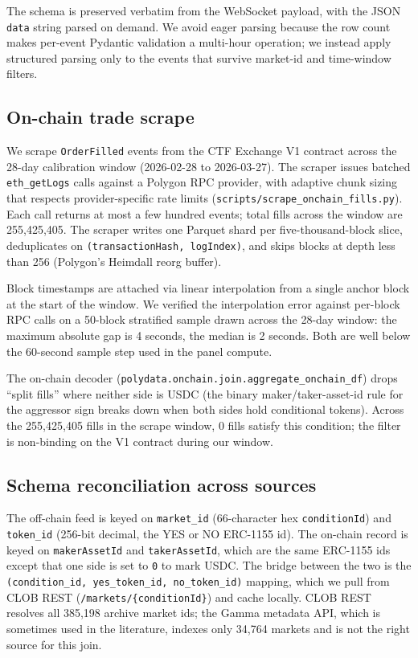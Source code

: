 \documentclass[11pt,a4paper,twocolumn]{article}
\begin{document}
The schema is preserved verbatim from the WebSocket payload, with
the JSON \texttt{data} string parsed on demand. We avoid eager
parsing because the row count makes per-event Pydantic validation a
multi-hour operation; we instead apply structured parsing only to
the events that survive market-id and time-window filters.

\subsection{On-chain trade scrape}

We scrape \texttt{OrderFilled} events from the CTF Exchange V1
contract across the 28-day calibration window (2026-02-28 to
2026-03-27). The scraper issues batched \texttt{eth\_getLogs} calls
against a Polygon RPC provider, with adaptive chunk sizing that
respects provider-specific rate limits
(\texttt{scripts/scrape\_onchain\_fills.py}). Each call returns at
most a few hundred events; total fills across the window are
255{,}425{,}405. The scraper writes one Parquet shard per
five-thousand-block slice, deduplicates on
\texttt{(transactionHash, logIndex)}, and skips blocks at
depth less than 256 (Polygon's Heimdall reorg buffer).

Block timestamps are attached via linear interpolation from a single
anchor block at the start of the window. We verified the
interpolation error against per-block RPC calls on a 50-block
stratified sample drawn across the 28-day window: the maximum
absolute gap is 4 seconds, the median is 2 seconds. Both are well
below the 60-second sample step used in the panel compute.

The on-chain decoder
(\texttt{polydata.\allowbreak onchain.\allowbreak join.\allowbreak aggregate\_onchain\_df})
drops
``split fills'' where neither side is USDC (the binary
maker/taker-asset-id rule for the aggressor sign breaks down when
both sides hold conditional tokens). Across the 255{,}425{,}405
fills in the scrape window, 0 fills satisfy this condition; the
filter is non-binding on the V1 contract during our window.

\subsection{Schema reconciliation across sources}

The off-chain feed is keyed on \texttt{market\_id} (66-character
hex \texttt{conditionId}) and \texttt{token\_id} (256-bit decimal,
the YES or NO ERC-1155 id). The on-chain record is keyed on
\texttt{makerAssetId} and \texttt{takerAssetId}, which are the same
ERC-1155 ids except that one side is set to \texttt{0} to mark
USDC. The bridge between the two is the
\texttt{(condition\_id, yes\_token\_id, no\_token\_id)} mapping,
which we pull from CLOB REST
(\texttt{/markets/\{conditionId\}}) and cache locally. CLOB REST
resolves all 385{,}198 archive market ids; the Gamma metadata API,
which is sometimes used in the literature, indexes only 34{,}764
markets and is not the right source for this join.
\end{document}
